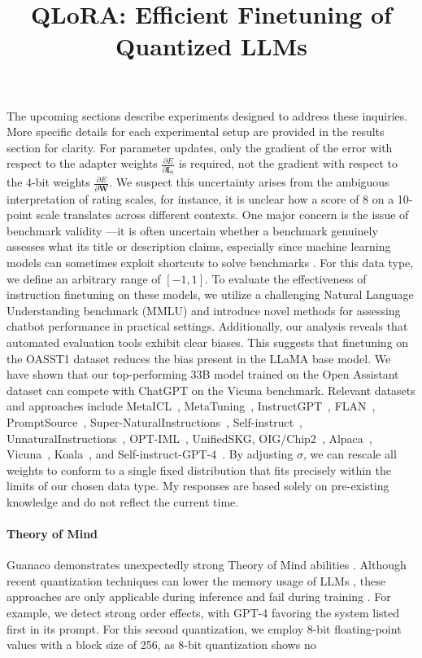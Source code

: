 \title{QLoRA: Efficient Finetuning of Quantized LLMs}
The upcoming sections describe experiments designed to address these inquiries. More specific details for each experimental setup are provided in the results section for clarity. For parameter updates, only the gradient of the error with respect to the adapter weights $\frac{\partial E}{\partial \mathbf{L}_i}$ is required, not the gradient with respect to the 4-bit weights $\frac{\partial E}{\partial \mathbf{W}}$. We suspect this uncertainty arises from the ambiguous interpretation of rating scales, for instance, it is unclear how a score of 8 on a 10-point scale translates across different contexts. One major concern is the issue of benchmark validity \citep{liao2021we}—it is often uncertain whether a benchmark genuinely assesses what its title or description claims, especially since machine learning models can sometimes exploit shortcuts to solve benchmarks \citep{gururangan2018annotation, poliak2018hypothesis}. For this data type, we define an arbitrary range of $[-1, 1]$. To evaluate the effectiveness of instruction finetuning on these models, we utilize a challenging Natural Language Understanding benchmark (MMLU) and introduce novel methods for assessing chatbot performance in practical settings. Additionally, our analysis reveals that automated evaluation tools exhibit clear biases. This suggests that finetuning on the OASST1 dataset reduces the bias present in the LLaMA base model. We have shown that our top-performing 33B model trained on the Open Assistant dataset can compete with ChatGPT on the Vicuna benchmark. Relevant datasets and approaches include MetaICL~\citep{min2021metaicl}, MetaTuning~\citep{zhong2021adapting}, InstructGPT~\citep{ouyang2022training}, FLAN~\citep{wei2021finetuned,chung2022scaling}, PromptSource~\citep{bach2022promptsource}, Super-NaturalInstructions~\citep{wang2022super,sanh2021multitask}, Self-instruct~\citep{wang2022self}, UnnaturalInstructions~\citep{honovich2022unnatural}, OPT-IML~\citep{iyer2022opt}, UnifiedSKG\citep{xie2022unifiedskg}, OIG/Chip2~\citep{laion2023}, Alpaca~\citep{alpaca}, Vicuna~\citep{vicuna2023}, Koala~\citep{koala_blogpost_2023}, and Self-instruct-GPT-4~\citep{peng2023instruction}. By adjusting $\sigma$, we can rescale all weights to conform to a single fixed distribution that fits precisely within the limits of our chosen data type. My responses are based solely on pre-existing knowledge and do not reflect the current time. \paragraph{Theory of Mind} {Guanaco} demonstrates unexpectedly strong Theory of Mind abilities \cite{nematzadeh2018evaluating, sap2022neural}. Although recent quantization techniques can lower the memory usage of LLMs \citep{dettmers2022llm, dettmers2022case, frantar2022gptq, xiao2022smoothquant}, these approaches are only applicable during inference and fail during training \citep{wortsman2023stable}. For example, we detect strong order effects, with GPT-4 favoring the system listed first in its prompt. For this second quantization, we employ 8-bit floating-point values with a block size of 256, as 8-bit quantization shows no 